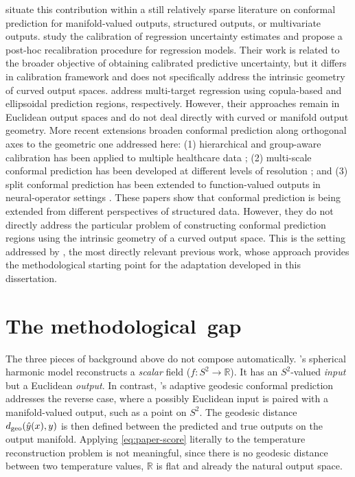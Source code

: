 \citet{amirishahbazi2026} situate this contribution within a still relatively sparse literature on conformal prediction for manifold-valued outputs, structured outputs, or multivariate outputs. \citet{kuleshov2018} study the calibration of regression uncertainty estimates and propose a post-hoc recalibration procedure for regression models. Their work is related to the broader objective of obtaining calibrated predictive uncertainty, but it differs in calibration framework and does not specifically address the intrinsic geometry of curved output spaces. \citet{messoudi2021,messoudi2022} address multi-target regression using copula-based and ellipsoidal prediction regions, respectively. However, their approaches remain in Euclidean output spaces and do not deal directly with curved or manifold output geometry. More recent extensions broaden conformal prediction along orthogonal axes to the geometric one addressed here: (1) hierarchical and group-aware calibration has been applied to multiple healthcare data \citep{amirishahbazi2026health}; (2) multi-scale conformal prediction has been developed at different levels of resolution \citep{baheri2025scales}; and (3) split conformal prediction has been extended to function-valued outputs in neural-operator settings \citep{millard2025neural}. These papers show that conformal prediction is being extended from different perspectives of structured data. However, they do not directly address the particular problem of constructing conformal prediction regions using the intrinsic geometry of a curved output space. This is the setting addressed by \citet{amirishahbazi2026}, the most directly relevant previous work, whose approach provides the methodological starting point for the adaptation developed in this dissertation.

\section{The methodological gap}
\label{sec:adaptation}

The three pieces of background above do not compose automatically. \citet{thomas2025}'s spherical harmonic model reconstructs a \emph{scalar} field ($f: S^2 \to \mathbb{R}$). It has an $S^2$-valued \emph{input} but a Euclidean \emph{output}. In contrast, \citet{amirishahbazi2026}'s adaptive geodesic conformal prediction addresses the reverse case, where a possibly Euclidean input is paired with a manifold-valued output, such as a point on $S^2$. The geodesic distance $d_{\mathrm{geo}}(\hat y(x), y)$ is then defined between the predicted and true outputs on the output manifold. Applying \cref{eq:paper-score} literally to the temperature reconstruction problem is not meaningful, since there is no geodesic distance between two temperature values, $\mathbb{R}$ is flat and already the natural output space.

